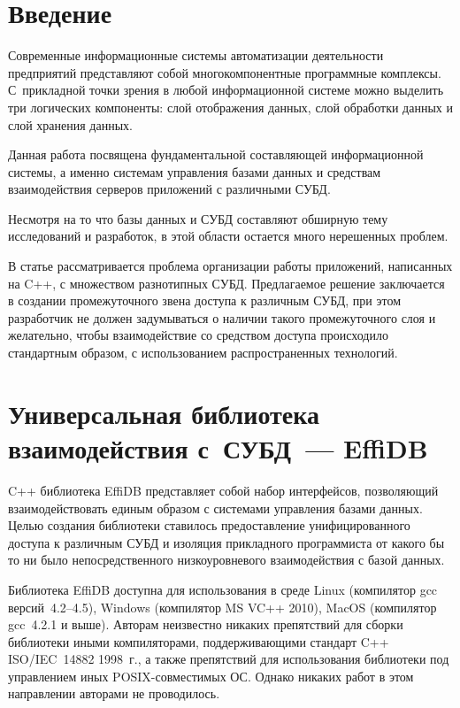       \begin{multicols}{2}
      
            \label{st\stat}

\section{Введение}

Современные информационные системы автоматизации деятельности предприятий 
пред\-став\-ляют собой многокомпонентные программные комплексы. С~прикладной точки 
зрения в любой информаци\-онной системе можно выделить три логических компоненты: 
слой отображения данных, слой обработки данных и слой хранения данных. 
{

}

Данная 
работа посвящена фундаментальной со\-став\-ля\-ющей информационной системы, а именно 
сис\-те\-мам управления базами данных и средствам взаимодействия серверов приложений с 
различными СУБД.

Несмотря на то что базы данных и СУБД со\-ставля\-ют обширную тему исследований и 
разработок, в этой области остается много нерешенных проб\-лем.

В статье рассматривается проблема организации работы приложений, написанных на C++, 
с множеством разнотипных СУБД. Предлагаемое решение заключается в создании 
промежуточного звена доступа к различным СУБД, при этом разработчик не должен 
задумываться о наличии такого промежуточного слоя и желательно, чтобы 
взаимодействие со средством доступа происходило стандартным образом, с 
использованием распространенных технологий.

\section{Универсальная библиотека взаимодействия с~СУБД~--- EffiDB}

\vspace*{-6pt}

C++ библиотека EffiDB представляет собой набор интерфейсов, позволяющий 
взаимодействовать единым образом с системами управления базами данных. Целью 
создания библиотеки ставилось предоставление унифицированного доступа к различным 
СУБД и изоляция прикладного программиста от какого бы то ни было непосредственного 
низкоуровневого взаимодействия с базой данных. 

Библиотека EffiDB доступна для использования в среде Linux (компилятор gcc версий~4.2--4.5), 
Windows (компилятор MS VC++ 2010), MacOS (компилятор gcc~4.2.1 и выше). Авторам 
неизвестно никаких препятствий для сборки библиотеки иными компиляторами, 
поддерживающими стандарт C++ ISO/IEC~14882 1998~г., а также препятствий для 
использования библиотеки под управлением иных POSIX-со\-вмес\-ти\-мых ОС. Однако 
никаких работ в этом направлении авторами не проводилось.


\end{multicols}
